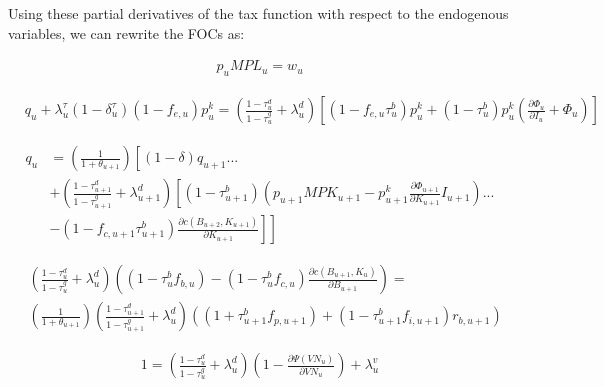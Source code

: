 Using these partial derivatives of the tax function with respect to the endogenous variables, we can rewrite the FOCs as:


\begin{equation}
\label{eqn:foc_l_tax}
\begin{split}
 p_{u}MPL_{u} = w_{u} 
 \end{split}
\end{equation}

 \begin{equation}
\label{eqn:foc_i_tax}
\begin{split}
 & q_{u} + \lambda^{\tau}_{u}(1-\delta^{\tau}_{u})(1-f_{e,u})p^{k}_{u} =  \left(\frac{1-\tau^{d}_{u}}{1-\tau^{g}_{u}} + \lambda^{d}_{u}\right)\left[(1-f_{e,u}\tau^{b}_{u})p^{k}_{u}+ (1-\tau^{b}_{u})p^{k}_{u}\left(\frac{\partial \Phi_{u}}{\partial I_{u}} + \Phi_{u}\right)\right]
\end{split}
\end{equation}


 \begin{equation}
\label{eqn:foc_k_tax}
\begin{split}
 q_{u} & = \left(\frac{1}{1+\theta_{u+1}}\right)\left[(1-\delta)q_{u+1} ... \right. \\
& \left. +  \left(\frac{1-\tau^{d}_{u+1}}{1-\tau^{g}_{u+1}} + \lambda^{d}_{u+1} \right)\left[(1-\tau^{b}_{u+1})\left(p_{u+1}MPK_{u+1}- p^{k}_{u+1}\frac{\partial \Phi_{u+1}}{\partial K_{u+1}}I_{u+1}\right)  ... \right.\right. \\
& \left.\left.-(1-f_{c,u+1}\tau^{b}_{u+1}) \frac{\partial c(B_{u+2},K_{u+1})}{\partial K_{u+1}} \right] \right]
\end{split}
\end{equation}

 \begin{equation}
\label{eqn:foc_b_tax}
\begin{split}
&  \left(\frac{1-\tau^{d}_{u}}{1-\tau^{g}_{u}} + \lambda^{d}_{u} \right)\left((1-\tau^{b}_{u}f_{b,u})-(1-\tau^{b}_{u}f_{c,u})\frac{\partial c(B_{u+1},K_{u})}{\partial B_{u+1}}\right)= \\
&  \left(\frac{1}{1+\theta_{u+1}}\right) \left(\frac{1-\tau^{d}_{u+1}}{1-\tau^{g}_{u+1}} + \lambda^{d}_{u} \right) \left((1+\tau^{b}_{u+1}f_{p,u+1})+(1-\tau^{b}_{u+1}f_{i,u+1})r_{b,u+1}\right)
 \end{split}
\end{equation}

 \begin{equation}
\label{eqn:foc_vn_tax}
\begin{split}
1 = \left(\frac{1-\tau^{d}_{u}}{1-\tau^{g}_{u}} + \lambda^{d}_{u}\right)\left(1-\frac{\partial \Psi(VN_{u})}{\partial VN_{u}}\right) + \lambda^{v}_{u}
 \end{split}
\end{equation}


